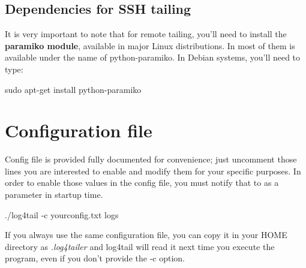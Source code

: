 \subsection{Dependencies for SSH tailing}
It is very important to note that for remote tailing, you'll need to install the \textbf{paramiko module}, 
available in major Linux distributions. In most of them is available under the name of python-paramiko. In 
Debian systems, you'll need to type:
\begin{cmd}
 sudo apt-get install python-paramiko
\end{cmd}

\section{Configuration file}
Config file is provided fully documented for convenience; just uncomment those lines you are interested 
to enable and modify them for your specific purposes. In order to enable those values in the config file, 
you must notify that to \logftailer{} as a parameter in startup time.
\begin{cmd}
 ./log4tail -c yourconfig.txt logs
\end{cmd}
If you always use the same configuration file, you can copy it in your HOME directory as \emph{.log4tailer} and log4tail will read it next time you execute the program, even if you 
don't provide the -c option.

